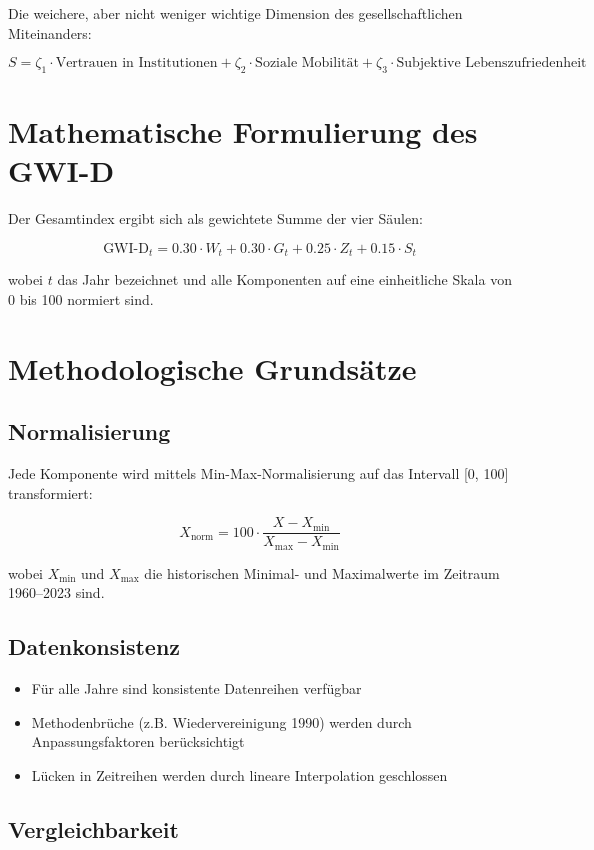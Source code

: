 Die weichere, aber nicht weniger wichtige Dimension des gesellschaftlichen Miteinanders:

\[
S = \zeta_1 \cdot \text{Vertrauen in Institutionen} + \zeta_2 \cdot \text{Soziale Mobilität} + \zeta_3 \cdot \text{Subjektive Lebenszufriedenheit}
\]

\section{Mathematische Formulierung des GWI-D}

Der Gesamtindex ergibt sich als gewichtete Summe der vier Säulen:

\[
\text{GWI-D}_t = 0.30 \cdot W_t + 0.30 \cdot G_t + 0.25 \cdot Z_t + 0.15 \cdot S_t
\]

wobei $t$ das Jahr bezeichnet und alle Komponenten auf eine einheitliche Skala von 0 bis 100 normiert sind.

\section{Methodologische Grundsätze}

\subsection{Normalisierung}

Jede Komponente wird mittels Min-Max-Normalisierung auf das Intervall [0, 100] transformiert:

\[
X_{\text{norm}} = 100 \cdot \frac{X - X_{\min}}{X_{\max} - X_{\min}}
\]

wobei $X_{\min}$ und $X_{\max}$ die historischen Minimal- und Maximalwerte im Zeitraum 1960--2023 sind.

\subsection{Datenkonsistenz}

\begin{itemize}
\item Für alle Jahre sind konsistente Datenreihen verfügbar
\item Methodenbrüche (z.B. Wiedervereinigung 1990) werden durch Anpassungsfaktoren berücksichtigt
\item Lücken in Zeitreihen werden durch lineare Interpolation geschlossen
\end{itemize}

\subsection{Vergleichbarkeit}

